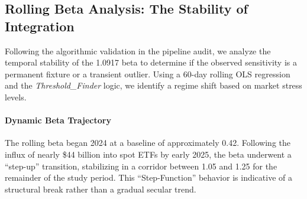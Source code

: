 \documentclass[10pt, conference, compsocconf]{IEEEtran}
\begin{document}




\subsection{Rolling Beta Analysis: The Stability of Integration}

Following the algorithmic validation in the pipeline audit, we analyze the temporal stability of the 1.0917 beta to determine if the observed sensitivity is a permanent fixture or a transient outlier. Using a 60-day rolling OLS regression and the \textit{Threshold\_Finder} logic, we identify a regime shift based on market stress levels.

\paragraph{Dynamic Beta Trajectory}
The rolling beta began 2024 at a baseline of approximately 0.42. Following the influx of nearly \$44 billion into spot ETFs by early 2025, the beta underwent a ``step-up'' transition, stabilizing in a corridor between 1.05 and 1.25 for the remainder of the study period. This ``Step-Function'' behavior is indicative of a structural break rather than a gradual secular trend.
\end{document}
